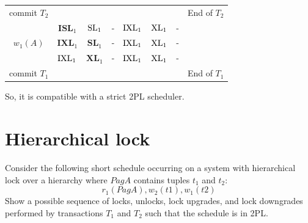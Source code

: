 \documentclass[12pt, a4paper]{report}
\begin{document}
\begin{table}[H]
\begin{tabular}{c|cccccc|c}
            \multicolumn{1}{|c|}{commit $T_2$} &                          &                         &            &                          &                     &                     & End of $T_2$ \\
            \multicolumn{1}{|c|}{}             & $\textbf{ISL}_1$         & $\textnormal{SL}_1$     & -          & $\textnormal{IXL}_1$     & $\textnormal{XL}_1$ & -                   &              \\
            \multicolumn{1}{|c|}{$w_1(A)$}     & $\textbf{IXL}_1$         & $\textbf{SL}_1$         & -          & $\textnormal{IXL}_1$     & $\textnormal{XL}_1$ & -                   &              \\
            \multicolumn{1}{|c|}{}             & $\textnormal{IXL}_1$     & $\textbf{XL}_1$         & -          & $\textnormal{IXL}_1$     & $\textnormal{XL}_1$ & -                   &              \\
            \multicolumn{1}{|c|}{commit $T_1$} &                          &                         &            &                          &                     &                     & End of $T_1$ \\ \cline{1-7}
            \end{tabular}
        \end{table}
        So, it is compatible with a strict 2PL scheduler. 

    \newpage

    \section{Hierarchical lock}
        Consider the following short schedule occurring on a system with hierarchical lock over a hierarchy where $PagA$ contains tuples 
        $t_1$ and $t_2$:
        \[r_1( PagA ), w_2( t1 ), w_1( t2 )\]
        Show a possible sequence of locks, unlocks, lock upgrades, and lock downgrades performed by transactions $T_1$ and $T_2$ such that
        the schedule is in 2PL.
\end{document}
